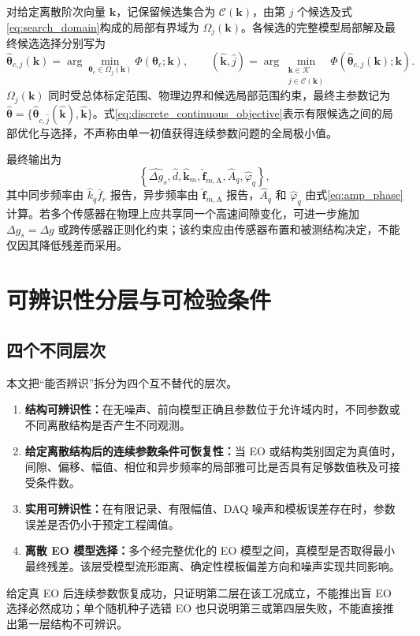 \documentclass[UTF8,12pt,a4paper]{ctexart}
\begin{document}
对给定离散阶次向量 $\bm k$，记保留候选集合为 $\mathcal C(\bm k)$，由第 $j$ 个候选及式\eqref{eq:search_domain}构成的局部有界域为 $\Omega_j(\bm k)$。各候选的完整模型局部解及最终候选选择分别写为
\begin{equation}
\widehat{\bm\theta}_{c,j}(\bm k)
=\arg\min_{\bm\theta_c\in\Omega_j(\bm k)}
\Phi(\bm\theta_c;\bm k),
\qquad
(\widehat{\bm k},\widehat j)
=\arg\min_{\substack{\bm k\in\mathcal K\\j\in\mathcal C(\bm k)}}
\Phi\!\left(\widehat{\bm\theta}_{c,j}(\bm k);\bm k\right).
\label{eq:discrete_continuous_objective}
\end{equation}
$\Omega_j(\bm k)$ 同时受总体标定范围、物理边界和候选局部范围约束，最终主参数记为 $\widehat{\bm\theta}=\{\widehat{\bm\theta}_{c,\widehat j}(\widehat{\bm k}),\widehat{\bm k}\}$。式\eqref{eq:discrete_continuous_objective}表示有限候选之间的局部优化与选择，不声称由单一初值获得连续参数问题的全局极小值。

最终输出为
\begin{equation}
\left\{
\widehat{\Delta g}_s,
\widehat d,
\widehat{\bm k}_m,
\widehat{\bm f}_{m,\mathrm A},
\widehat A_q,
\widehat\varphi_q
\right\},
\label{eq:outputs}
\end{equation}
其中同步频率由 $\widehat k_q\bar f_r$ 报告，异步频率由 $\widehat{\bm f}_{m,\mathrm A}$ 报告，$\widehat A_q$ 和 $\widehat\varphi_q$ 由式\eqref{eq:amp_phase}计算。若多个传感器在物理上应共享同一个高速间隙变化，可进一步施加 $\Delta g_s=\Delta g$ 或跨传感器正则化约束；该约束应由传感器布置和被测结构决定，不能仅因其降低残差而采用。

\section{可辨识性分层与可检验条件}
\label{sec:identifiability}

\subsection{四个不同层次}

本文把“能否辨识”拆分为四个互不替代的层次。
\begin{enumerate}
  \item \textbf{结构可辨识性：}在无噪声、前向模型正确且参数位于允许域内时，不同参数或不同离散结构是否产生不同观测。
  \item \textbf{给定离散结构后的连续参数条件可恢复性：}当 EO 或结构类别固定为真值时，间隙、偏移、幅值、相位和异步频率的局部雅可比是否具有足够数值秩及可接受条件数。
  \item \textbf{实用可辨识性：}在有限记录、有限幅值、DAQ 噪声和模板误差存在时，参数误差是否仍小于预定工程阈值。
  \item \textbf{离散 EO 模型选择：}多个经完整优化的 EO 模型之间，真模型是否取得最小最终残差。该层受模型流形距离、确定性模板偏差方向和噪声实现共同影响。
\end{enumerate}
给定真 EO 后连续参数恢复成功，只证明第二层在该工况成立，不能推出盲 EO 选择必然成功；单个随机种子选错 EO 也只说明第三或第四层失败，不能直接推出第一层结构不可辨识。
\end{document}
